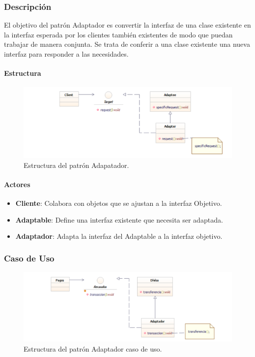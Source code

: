 \subsubsection{Descripción}
	El objetivo del patrón Adaptador es convertir la interfaz de una clase existente en la interfaz esperada por los clientes también existentes de modo que puedan trabajar de manera conjunta. Se trata de conferir a una clase existente una nueva interfaz para responder a las necesidades.

\paragraph{Estructura}

\begin{figure}[th!]
	\centering
	\includegraphics[width=.8\linewidth]{imagenes/Patrones/Adaptador.pdf}
	\caption{Estructura del patrón Adapatador.\cite{gof}}	
\end{figure}

\paragraph{Actores}

\begin{itemize}
	\item \textbf{Cliente}: Colabora con objetos que se ajustan a la interfaz Objetivo.
	\item \textbf{Adaptable}: Define una interfaz existente  que necesita ser adaptada.
	\item \textbf{Adaptador}: Adapta la interfaz del Adaptable a la interfaz objetivo.
\end{itemize}	


\subsubsection{Caso de Uso}

\begin{figure}[th!]
	\centering
	\includegraphics[width=.8\linewidth]{imagenes/Patrones/Adaptador_caso.pdf}
	\caption{Estructura del patrón Adaptador caso de uso. \cite{gof}}	
\end{figure}

